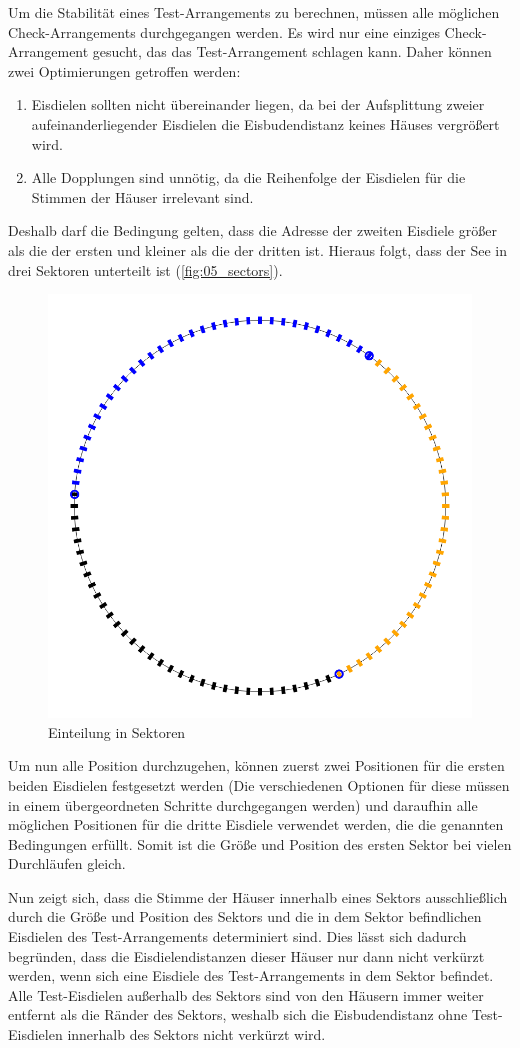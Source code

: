 \documentclass[a4paper,10pt,ngerman]{scrartcl}
\begin{document}
\medskip
Um die Stabilität eines Test-Arrangements zu berechnen, müssen alle möglichen Check-Arrangements durchgegangen werden.
Es wird nur eine einziges Check-Arrangement gesucht, das das Test-Arrangement schlagen kann.
Daher können zwei Optimierungen getroffen werden:
\begin{enumerate}
    \item Eisdielen sollten nicht übereinander liegen, da bei der Aufsplittung zweier aufeinanderliegender Eisdielen die Eisbudendistanz keines Häuses vergrößert wird.
    \item Alle Dopplungen sind unnötig, da die Reihenfolge der Eisdielen für die Stimmen der Häuser irrelevant sind.
\end{enumerate}
Deshalb darf die Bedingung gelten, dass die Adresse der zweiten Eisdiele größer als die der ersten und kleiner als die der dritten ist.
Hieraus folgt, dass der See in drei Sektoren unterteilt ist (\autoref{fig:05_sectors}).
\begin{figure}[ht]
    \centering
    \includegraphics[width=0.4\linewidth]{05_sectors.png}
    \caption{Einteilung in Sektoren}
    \label{fig:05_sectors}
\end{figure}

Um nun alle Position durchzugehen, können zuerst zwei Positionen für die ersten beiden Eisdielen festgesetzt werden (Die verschiedenen Optionen für diese müssen in einem übergeordneten Schritte durchgegangen werden) und daraufhin alle möglichen Positionen für die dritte Eisdiele verwendet werden, die die genannten Bedingungen erfüllt.
Somit ist die Größe und Position des ersten Sektor bei vielen Durchläufen gleich.

Nun zeigt sich, dass die Stimme der Häuser innerhalb eines Sektors ausschließlich durch die Größe und Position des Sektors und die in dem Sektor befindlichen Eisdielen des Test-Arrangements determiniert sind.
Dies lässt sich dadurch begründen, dass die Eisdielendistanzen dieser Häuser nur dann nicht verkürzt werden, wenn sich eine Eisdiele des Test-Arrangements in dem Sektor befindet.
Alle Test-Eisdielen außerhalb des Sektors sind von den Häusern immer weiter entfernt als die Ränder des Sektors, weshalb sich die Eisbudendistanz ohne Test-Eisdielen innerhalb des Sektors nicht verkürzt wird.
\end{document}
